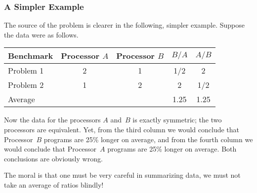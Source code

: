 
\subsubsection{A Simpler Example}

The source of the problem is clearer in the following, simpler
example.  Suppose the data were as follows.
\begin{center}
\begin{tabular}{lcccc}
Benchmark   & Processor $A$ & Processor $B$ & $B / A$   & $A / B$  \\
\hline
Problem 1   & 2             & 1             & 1/2       & 2 \\
Problem 2   & 1             & 2             & 2         & 1/2 \\
\hline
Average     &               &               & 1.25      & 1.25
\end{tabular}
\end{center}

Now the data for the processors $A$ and~$B$ is exactly symmetric; the
two processors are equivalent.  Yet, from the third column we would
conclude that Processor~$B$ programs are 25\% longer on average, and
from the fourth column we would conclude that Processor~$A$ programs
are 25\% longer on average.  Both conclusions are obviously wrong.

The moral is that one must be very careful in summarizing data, we must
not take an average of ratios blindly!


\begin{problems}
\practiceproblems
{}

\classproblems
{}

\homeworkproblems
{}
\end{problems}



\problemsection

